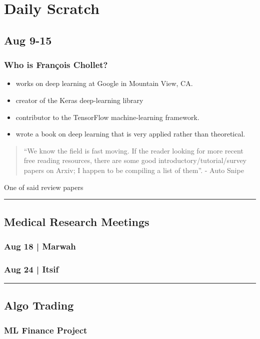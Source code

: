 
\chapter{Daily Scratch}
\section{Aug 9-15}

\subsection*{Who is François Chollet?}
\begin{itemize}
\item
	works on deep learning at Google in Mountain View, CA.
\item
	creator of the Keras deep-learning library
\item
	contributor to the TensorFlow machine-learning framework.
\item
	wrote a book on deep learning that is very applied rather than theoretical.
\end{itemize}

\begin{quote}
``We know the field is fast moving. If the reader looking for more recent free reading resources, there are some good introductory/tutorial/survey papers on Arxiv; I happen to be compiling a list of them''. - Auto Snipe
\end{quote}

 One of said review papers \cite{raghu2020survey}


\hrule
\section{Medical Research Meetings}

\subsection*{Aug 18 | Marwah}


\subsection*{Aug 24 |  Itsif}

\hrule
\section{Algo Trading}

\subsection{ML Finance Project}

